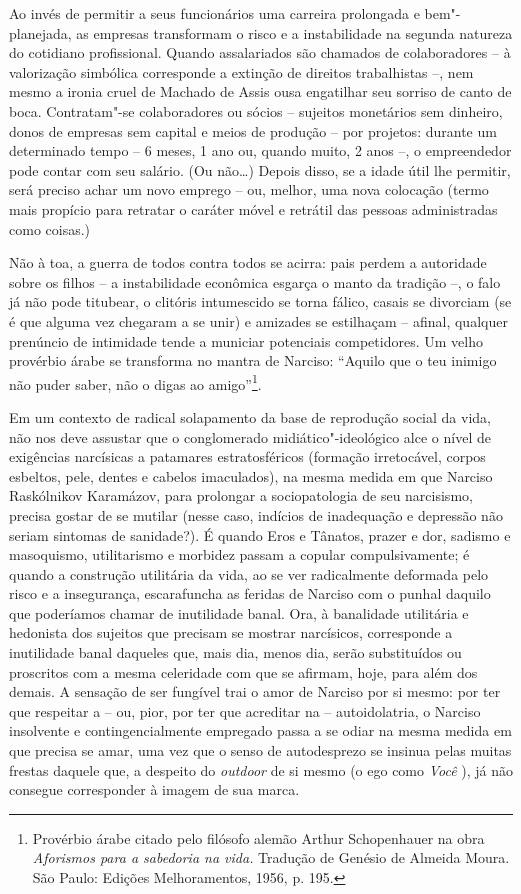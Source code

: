 Ao invés de permitir a seus funcionários uma carreira prolongada e
bem"-planejada, as empresas transformam o risco e a instabilidade na
segunda natureza do cotidiano profissional. Quando assalariados são
chamados de colaboradores -- à valorização simbólica corresponde a
extinção de direitos trabalhistas --, nem mesmo a ironia cruel de
Machado de Assis ousa engatilhar seu sorriso de canto de boca.
Contratam"-se colaboradores ou sócios -- sujeitos monetários sem
dinheiro, donos de empresas sem capital e meios de produção -- por
projetos: durante um determinado tempo -- 6 meses, 1 ano ou, quando
muito, 2 anos --, o empreendedor pode contar com seu salário. (Ou
não\ldots{}) Depois disso, se a idade útil lhe permitir, será preciso achar
um novo emprego -- ou, melhor, uma nova colocação (termo mais propício
para retratar o caráter móvel e retrátil das pessoas administradas como
coisas.)

Não à toa, a guerra de todos contra todos se acirra: pais perdem a
autoridade sobre os filhos -- a instabilidade econômica esgarça o manto
da tradição --, o falo já não pode titubear, o clitóris intumescido se
torna fálico, casais se divorciam (se é que alguma vez chegaram a se
unir) e amizades se estilhaçam -- afinal, qualquer prenúncio de
intimidade tende a municiar potenciais competidores. Um velho provérbio
árabe se transforma no mantra de Narciso: ``Aquilo que o teu inimigo não
puder saber, não o digas ao amigo''\footnote{Provérbio árabe citado pelo
  filósofo alemão Arthur Schopenhauer na obra \emph{Aforismos para a
  sabedoria na vida.} Tradução de Genésio de Almeida Moura. São Paulo:
  Edições Melhoramentos, 1956, p. 195.}.

Em um contexto de radical solapamento da base de reprodução social da
vida, não nos deve assustar que o conglomerado midiático"-ideológico alce
o nível de exigências narcísicas a patamares estratosféricos (formação
irretocável, corpos esbeltos, pele, dentes e cabelos imaculados), na
mesma medida em que Narciso Raskólnikov Karamázov, para prolongar a
sociopatologia de seu narcisismo, precisa gostar de se mutilar (nesse
caso, indícios de inadequação e depressão não seriam sintomas de
sanidade?). É quando Eros e Tânatos, prazer e dor, sadismo e masoquismo,
utilitarismo e morbidez passam a copular compulsivamente; é quando a
construção utilitária da vida, ao se ver radicalmente deformada pelo
risco e a insegurança, escarafuncha as feridas de Narciso com o punhal
daquilo que poderíamos chamar de inutilidade banal. Ora, à banalidade
utilitária e hedonista dos sujeitos que precisam se mostrar narcísicos,
corresponde a inutilidade banal daqueles que, mais dia, menos dia, serão
substituídos ou proscritos com a mesma celeridade com que se afirmam,
hoje, para além dos demais. A sensação de ser fungível trai o amor de
Narciso por si mesmo: por ter que respeitar a -- ou, pior, por ter que
acreditar na -- autoidolatria, o Narciso insolvente e contingencialmente
empregado passa a se odiar na mesma medida em que precisa se amar, uma
vez que o senso de autodesprezo se insinua pelas muitas frestas daquele
que, a despeito do \emph{outdoor} de si mesmo (o ego como \emph{Você
}), já não consegue corresponder à imagem de sua marca.

